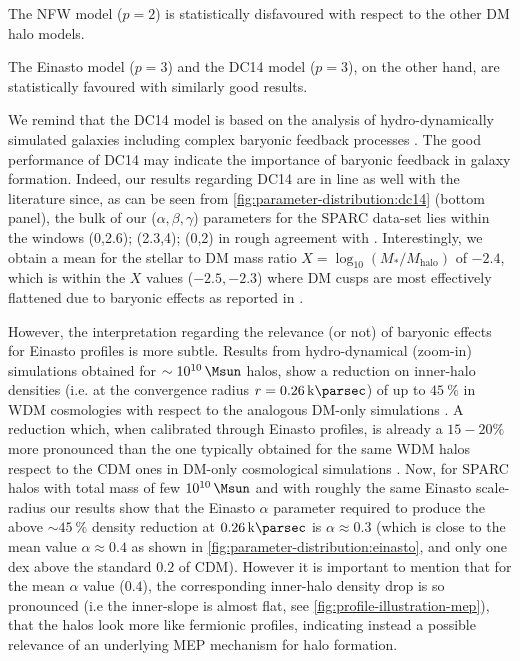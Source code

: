 \begin{asparaenum}[(i)]
    \item The NFW model ($p=2$) is statistically disfavoured with respect to the other DM halo models.

    \item The Einasto model ($p=3$) and the DC14 model ($p=3$), on the other hand, are statistically favoured with similarly good results.
    
    We remind that the DC14 model is based on the analysis of hydro-dynamically simulated galaxies including complex baryonic feedback processes \citep{2014MNRAS.441.2986D}. The good performance of DC14 may indicate the importance of baryonic feedback in galaxy formation. Indeed, our results regarding DC14 are in line as well with the literature since, as can be seen from \cref{fig:parameter-distribution:dc14} (bottom panel), the bulk of our ($\alpha,\beta,\gamma$) parameters for the SPARC data-set lies within the windows (0,2.6); (2.3,4); (0,2) in rough agreement with \citet{2014MNRAS.441.2986D}. Interestingly, we obtain a mean for the stellar to DM mass ratio $X = \log_{10}(M_*/M_\mathrm{halo})$ of $-2.4$, which is within the $X$ values ($-2.5,-2.3$) where DM cusps are most effectively flattened due to baryonic effects as reported in \citet{2014MNRAS.441.2986D}.   
    
    However, the interpretation regarding the relevance (or not) of baryonic effects for Einasto profiles is more subtle. Results from hydro-dynamical (zoom-in) simulations obtained for $\sim \SI{E10}{\Msun}$ halos, show a reduction on inner-halo densities (i.e. at the convergence radius $r=\SI{0.26}{\kilo\parsec}$) of up to $\SI{45}{\percent}$ in WDM cosmologies with respect to the analogous DM-only simulations \citep{2019MNRAS.483.4086B}. A reduction which, when calibrated through Einasto profiles, is already a $15-20 \%$ more pronounced than the one typically obtained for the same WDM halos respect to the CDM ones in DM-only cosmological simulations \citep{2019MNRAS.483.4086B}. Now, for SPARC halos with total mass of few $\SI{E10}{\Msun}$ and with roughly the same Einasto scale-radius our results show that the Einasto $\alpha$ parameter required to produce the above $\sim\SI{45}{\percent}$ density reduction at $\SI{0.26}{\kilo\parsec}$ is $\alpha\approx 0.3$ (which is close to the mean value $\alpha \approx 0.4$ as shown in \cref{fig:parameter-distribution:einasto}, and only one dex above the standard $0.2$ of CDM). However it is important to mention that for the mean $\alpha$ value ($0.4$), the corresponding inner-halo density drop is so pronounced (i.e the inner-slope is almost flat, see \cref{fig:profile-illustration-mep}), that the halos look more like fermionic profiles, indicating instead a possible relevance of an underlying MEP mechanism for halo formation.


\end{asparaenum}
